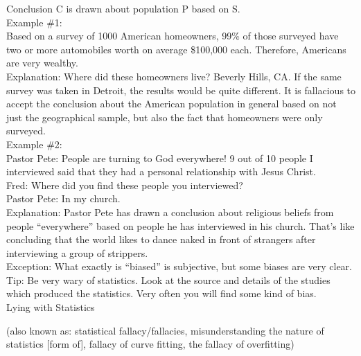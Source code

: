 \documentclass[a4paper,12pt,single,pdftex]{scrartcl}
\begin{document}
    
      Conclusion C is drawn about population P based on S.
    \\

    
      Example \#1:
    \\

    
      Based on a survey of 1000 American homeowners, 99\% of those surveyed have two or more automobiles worth on average \$100,000 each.  Therefore, Americans are very wealthy.
    \\

    
      Explanation: Where did these homeowners live?  Beverly Hills, CA.  If the same survey was taken in Detroit, the results would be quite different.  It is fallacious to accept the conclusion about the American population in general based on not just the geographical sample, but also the fact that homeowners were only surveyed.
    \\

    
      Example \#2:
    \\

    
      Pastor Pete: People are turning to God everywhere!  9 out of 10 people I interviewed said that they had a personal relationship with Jesus Christ.
    \\

    
      Fred: Where did you find these people you interviewed?
    \\

    
      Pastor Pete: In my church.
    \\

    
      Explanation: Pastor Pete has drawn a conclusion about religious beliefs from people “everywhere” based on people he has interviewed in his church.  That’s like concluding that the world likes to dance naked in front of strangers after interviewing a group of strippers.
    \\

    
      Exception: What exactly is “biased” is subjective, but some biases are very clear.
    \\

    
      Tip: Be very wary of statistics.  Look at the source and details of the studies which produced the statistics.  Very often you will find some kind of bias.
    \\

  

Lying with Statistics
    
      (also known as: statistical fallacy/fallacies, misunderstanding the nature of statistics [form of], fallacy of curve fitting, the fallacy of overfitting)
    \\
\end{document}
